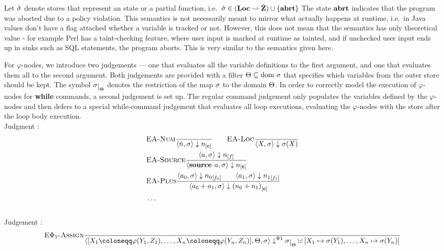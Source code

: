 Let $\hat{\sigma}{}$ denote stores that represent an \exception{}
state or a partial function, i.e.\ $\hat{\sigma}{} \in (\textbf{Loc} \rightharpoonup \tilde{\textbf{Z}}) \cup \{\textbf{abrt}\}$
The state $\textbf{abrt}$ indicates that the program was aborted due to a policy violation.
This semantics is not necessarily meant to mirror what actually happens at runtime, i.e.\ 
in Java values don't have a flag attached whether a variable is tracked or not.
However, this does not mean that the semantics has only theoretical value - for example 
Perl has a taint-checking feature, where user input is marked at runtime as tainted,
and if unchecked user input ends up in sinks such as SQL statements, the program aborts.
This is very similar to the semantics given here.

For $\varphi$-nodes, we introduce two judgements --- one that evaluates all the variable definitions
to the first argument, and one that evaluates them all to the second argument.
Both judgements are provided with a filter $\Theta \subseteq \text{dom }{\sigma}$ that specifies which variables 
from the outer store should be kept.
The symbol $\store\restrict{\filter}$ denotes the restriction of the map $\sigma$
to the domain $\Theta$.
In order to correctly model the execution of $\varphi$-nodes for \textbf{while} commands,
a second judgement is set up.
The regular command judgement only populates the variables defined by the $\varphi$-nodes
and then defers to a special while-command judgement that evaluates all loop executions,
evaluating the $\varphi$-nodes with the store after the loop body execution.
\\
Judgment :
\begin{align*}
    &\bsrule{EA-Num}{}{\bigstep{\literalint}{\store}{\clean}} \qquad
    \bsrule{EA-Loc}{}{\bigstep{X}{\store}{\store(X)}}\\
    &\bsrule{EA-Source}{\bigstep{a}{\store}{\flagged}}
    {\bigstep{\source{a}}{\store}{\tracked}}\\
    &\bsrule{EA-Plus}
    {\bigstep{a_0}{\store}{\flagged[n_0][0]}
    \qquad \bigstep{a_1}{\store}{\flagged[n_1][1]}}
    {\bigstep{a_0+a_1}{\store}{\clean[(n_0+n_1)]}}\\
    &\ldots\\
\end{align*}
\\
Judgement :
\begin{align*}
    &\bsrule{E$\Phi_1$-Assign}{}
    {\bigsteppl{\defaultphilistn}{\filter}{\store}{\storeassign{\store\restrict{\filter}}{X_1 \mapsto \store(Y_1),\ldots, X_n \mapsto \store(Y_n)}}}\\
\end{align*}
